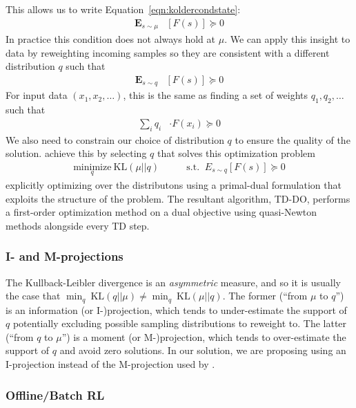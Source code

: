 \documentclass[11pt]{article}
\newcommand{\E}{\textbf{E}}
\begin{document}
This allows us to write Equation~\ref{eqn:koldercondstate}:
\begin{align}
\E_{s\sim \mu} & [F(s)] \succcurlyeq 0
\end{align}
In practice this condition does not always hold at $\mu$. We can apply this insight to data by reweighting incoming samples so they are consistent with a different distribution $q$ such that
\begin{align}
\E_{s\sim q} & [F(s)] \succcurlyeq 0
\end{align}
For input data $(x_1, x_2, \ldots)$, this is the same as finding a set of weights $q_1, q_2, \ldots$ such that
\begin{align}
\sum_i q_i & \cdot F(x_i) \succcurlyeq 0
\end{align}
We also need to constrain our choice of distribution $q$ to ensure the quality of the solution. \citet{kolter2011fixed} achieve this by selecting $q$ that solves this optimization problem
\begin{align}
    \underset{q}{\text{minimize}}~\text{KL}(\mu||q) & \qquad \text{s.t. } ~ E_{s\sim q}[F(s)] \succcurlyeq 0 \label{eqn:kolter2011objective}
\end{align}
explicitly optimizing over the distributons using a primal-dual formulation that exploits the structure of the problem. The resultant algorithm, TD-DO, performs a first-order optimization method on a dual objective using quasi-Newton methods alongside every TD step.


\subsubsection{I- and M-projections} \label{sec:improj}
The Kullback-Leibler divergence is an \emph{asymmetric} measure, and so it is usually the case that $\min_q~\text{KL}(q||\mu) \neq \min_q~\text{KL}(\mu||q)$. The former (``from $\mu$ to $q$'') is an information (or I-)projection, which tends to under-estimate the support of $q$ potentially excluding possible sampling distributions to reweight to. The latter (``from $q$ to $\mu$'') is a moment (or M-)projection, which tends to over-estimate the support of $q$ and avoid zero solutions. In our solution, we are proposing using an I-projection instead of the M-projection used by \citet{kolter2011fixed}. 

\subsubsection{Offline/Batch RL} \label{sec:offlinerlbackground}
\end{document}

